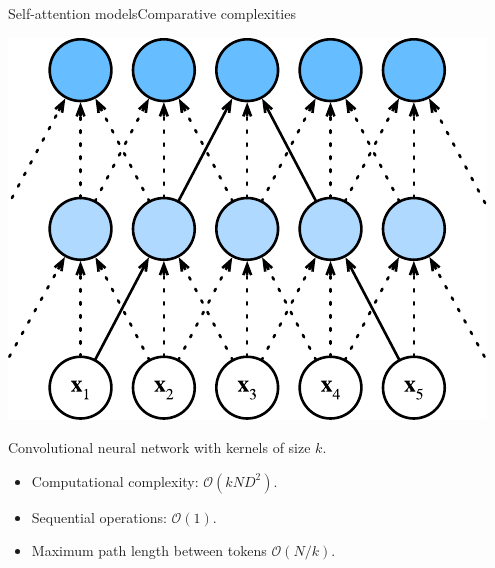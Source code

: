 \documentclass{beamer}
\begin{document}
\begin{frame}{Self-attention models}{Comparative complexities}

\begin{multicols}{2}
\begin{center}
\includegraphics[scale=0.6]{Module 6 (Attention-based networks)/pics/cnn-complexity.pdf}
\end{center}

\columnbreak
Convolutional neural network with kernels of size $k$.
\begin{itemize}
    \item Computational complexity: $\mathcal{O}(kND^2)$.
    \item Sequential operations: $\mathcal{O}(1)$.
    \item Maximum path length between tokens $\mathcal{O}(N/k)$. 
\end{itemize}

\end{multicols}
\end{frame}
\end{document}
